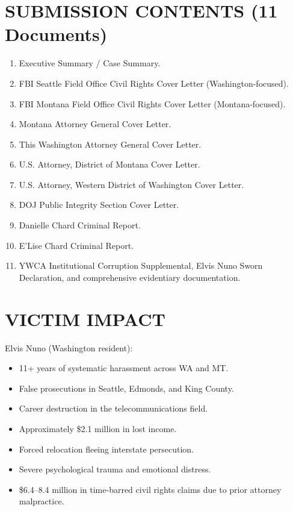 \documentclass[12pt,oneside]{article}
\begin{document}
\begin{flushleft}
\section*{SUBMISSION CONTENTS (11 Documents)}

\begin{enumerate}
\item Executive Summary / Case Summary.
\item FBI Seattle Field Office Civil Rights Cover Letter (Washington-focused).
\item FBI Montana Field Office Civil Rights Cover Letter (Montana-focused).
\item Montana Attorney General Cover Letter.
\item This Washington Attorney General Cover Letter.
\item U.S. Attorney, District of Montana Cover Letter.
\item U.S. Attorney, Western District of Washington Cover Letter.
\item DOJ Public Integrity Section Cover Letter.
\item Danielle Chard Criminal Report.
\item E'Lise Chard Criminal Report.
\item YWCA Institutional Corruption Supplemental, Elvis Nuno Sworn Declaration, and comprehensive evidentiary documentation.
\end{enumerate}

\section*{VICTIM IMPACT}

Elvis Nuno (Washington resident):

\begin{itemize}
\item 11+ years of systematic harassment across WA and MT.
\item False prosecutions in Seattle, Edmonds, and King County.
\item Career destruction in the telecommunications field.
\item Approximately \$2.1 million in lost income.
\item Forced relocation fleeing interstate persecution.
\item Severe psychological trauma and emotional distress.
\item \$6.4--8.4 million in time-barred civil rights claims due to prior attorney malpractice.
\end{itemize}


\end{flushleft}
\end{document}
